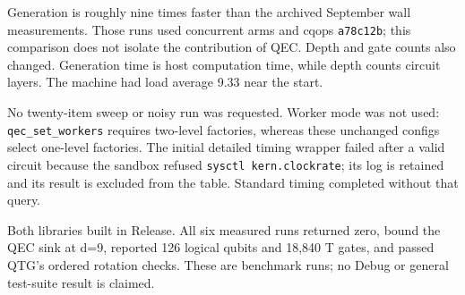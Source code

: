 \begin{figures}
\end{figures}
Generation is roughly nine times faster than the archived September wall
measurements. Those runs used concurrent arms and cqops \texttt{a78c12b}; this
comparison does not isolate the contribution of QEC. Depth and gate counts
also changed. Generation time is host computation time, while depth counts
circuit layers. The machine had load average 9.33 near the start.

No twenty-item sweep or noisy run was requested. Worker mode was not used:
\texttt{qec\_set\_workers} requires two-level factories, whereas these
unchanged configs select one-level factories. The initial detailed timing
wrapper failed after a valid circuit because the sandbox refused
\texttt{sysctl kern.clockrate}; its log is retained and its result is excluded
from the table. Standard timing completed without that query.

Both libraries built in Release. All six measured runs returned zero,
bound the QEC sink at d=9, reported 126 logical qubits and 18{,}840 T gates,
and passed QTG's ordered rotation checks. These are benchmark runs; no Debug
or general test-suite result is claimed.
